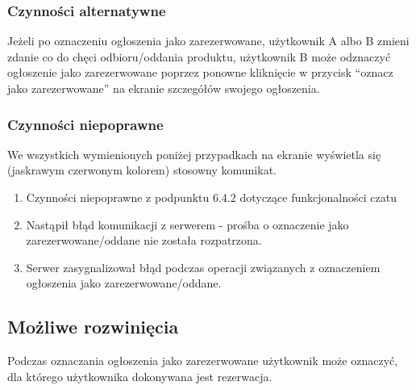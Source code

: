 \documentclass[12pt,a4paper,twoside]{article}
\begin{document}
    \subsubsection{Czynności alternatywne}
    Jeżeli po oznaczeniu ogłoszenia jako zarezerwowane, użytkownik A albo B zmieni zdanie co do chęci odbioru/oddania produktu, użytkownik B może odznaczyć ogłoszenie jako zarezerwowane poprzez ponowne kliknięcie w przycisk ``oznacz jako zarezerwowane'' na ekranie szczegółów swojego ogłoszenia.
    
    
    \subsubsection{Czynności niepoprawne}
    We wszystkich wymienionych poniżej przypadkach na ekranie wyświetla się (jaskrawym czerwonym kolorem) stosowny komunikat.
    \begin{enumerate}
        \item Czynności niepoprawne z podpunktu 6.4.2 dotyczące funkcjonalności czatu
        \item Nastąpił błąd komunikacji z serwerem - prośba o oznaczenie jako zarezerwowane/oddane nie została rozpatrzona.
        \item Serwer zasygnalizował błąd podczas operacji związanych z oznaczeniem ogłoszenia jako zarezerwowane/oddane.
    \end{enumerate}

    \subsection{Możliwe rozwinięcia}
    Podczas oznaczania ogłoszenia jako zarezerwowane użytkownik może oznaczyć, dla którego użytkownika dokonywana jest rezerwacja.

    
    
\end{document}

